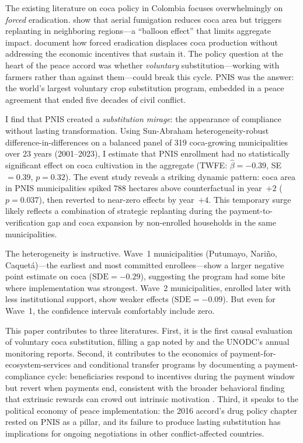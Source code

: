 \documentclass[12pt]{article}
\begin{document}
The existing literature on coca policy in Colombia focuses overwhelmingly on \emph{forced} eradication. \citet{mejia2013} show that aerial fumigation reduces coca area but triggers replanting in neighboring regions---a ``balloon effect'' that limits aggregate impact. \citet{reyes2019} document how forced eradication displaces coca production without addressing the economic incentives that sustain it. The policy question at the heart of the peace accord was whether \emph{voluntary} substitution---working with farmers rather than against them---could break this cycle. PNIS was the answer: the world's largest voluntary crop substitution program, embedded in a peace agreement that ended five decades of civil conflict.

I find that PNIS created a \emph{substitution mirage}: the appearance of compliance without lasting transformation. Using Sun-Abraham heterogeneity-robust difference-in-differences on a balanced panel of 319 coca-growing municipalities over 23 years (2001--2023), I estimate that PNIS enrollment had no statistically significant effect on coca cultivation in the aggregate (TWFE: $\hat{\beta} = -0.39$, SE $= 0.39$, $p = 0.32$). The event study reveals a striking dynamic pattern: coca area in PNIS municipalities spiked 788 hectares above counterfactual in year~$+2$ ($p = 0.037$), then reverted to near-zero effects by year~$+4$. This temporary surge likely reflects a combination of strategic replanting during the payment-to-verification gap and coca expansion by non-enrolled households in the same municipalities.

The heterogeneity is instructive. Wave~1 municipalities (Putumayo, Nari\~{n}o, Caquet\'{a})---the earliest and most committed enrollees---show a larger negative point estimate on coca ($\text{SDE} = -0.29$), suggesting the program had some bite where implementation was strongest. Wave~2 municipalities, enrolled later with less institutional support, show weaker effects ($\text{SDE} = -0.09$). But even for Wave~1, the confidence intervals comfortably include zero.

This paper contributes to three literatures. First, it is the first causal evaluation of voluntary coca substitution, filling a gap noted by \citet{zuleta2017} and the UNODC's annual monitoring reports. Second, it contributes to the economics of payment-for-ecosystem-services and conditional transfer programs by documenting a payment-compliance cycle: beneficiaries respond to incentives during the payment window but revert when payments end, consistent with the broader behavioral finding that extrinsic rewards can crowd out intrinsic motivation \citep{gneezy2011}. Third, it speaks to the political economy of peace implementation: the 2016 accord's drug policy chapter rested on PNIS as a pillar, and its failure to produce lasting substitution has implications for ongoing negotiations in other conflict-affected countries.
\end{document}
